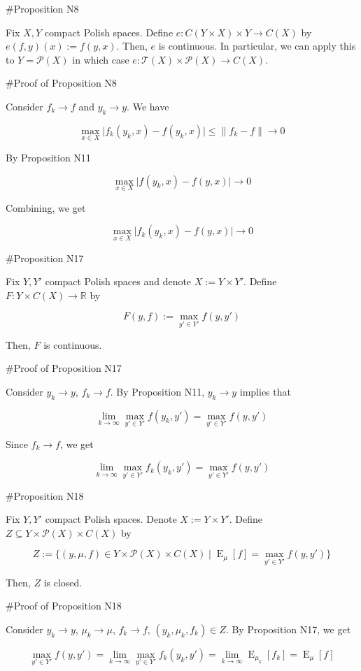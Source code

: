 \documentclass[a4paper]{article}
\DeclareMathOperator{\E}{E}
\newcommand{\Reals}{\mathbb{R}}
\newcommand{\Abs}[1]{\lvert #1 \rvert}
\newcommand{\Norm}[1]{\lVert #1 \rVert}
\newcommand{\Prob}{\mathcal{P}}
\newcommand{\T}{\mathcal{T}}
\begin{document}
\#Proposition N8

Fix ${X,Y}$ compact Polish spaces. Define ${e: C(Y \times X) \times Y \rightarrow C(X)}$ by ${e(f,y)(x):=f(y,x)}$. Then, ${e}$ is continuous. In particular, we can apply this to ${Y = \Prob(X)}$ in which case ${e: \T(X) \times \Prob(X) \rightarrow C(X)}$.

\#Proof of Proposition N8

Consider ${f_k \rightarrow f}$ and ${y_k \rightarrow y}$. We have

$$\max_{x \in X} \Abs{f_k(y_k,x)-f(y_k,x)} \leq \Norm{f_k - f} \rightarrow 0$$

By Proposition N11

$$\max_{x \in X} \Abs{f(y_k,x)-f(y,x)} \rightarrow 0$$

Combining, we get

$$\max_{x \in X} \Abs{f_k(y_k,x)-f(y,x)} \rightarrow 0$$

\#Proposition N17

Fix ${Y,Y'}$ compact Polish spaces and denote ${X:=Y \times Y'}$. Define ${F: Y \times C(X) \rightarrow \Reals}$ by 

$${F(y,f):=\max_{y' \in Y'} f(y,y')}$$

Then, ${F}$ is continuous.

\#Proof of Proposition N17

Consider ${y_k \rightarrow y}$, ${f_k \rightarrow f}$. By Proposition N11, ${y_k \rightarrow y}$ implies that

$${\lim_{k \rightarrow \infty} \max_{y' \in Y'} f(y_k,y') = \max_{y' \in Y'} f(y,y')}$$

Since ${f_k \rightarrow f}$, we get

$${\lim_{k \rightarrow \infty} \max_{y' \in Y'} f_k(y_k,y') = \max_{y' \in Y'} f(y,y')}$$

\#Proposition N18

Fix ${Y,Y'}$ compact Polish spaces. Denote ${X:=Y \times Y'}$. Define ${Z \subseteq Y \times \Prob(X) \times C(X)}$ by

$$Z:=\{(y,\mu,f) \in Y \times \Prob(X) \times C(X) \mid \E_\mu[f] = \max_{y' \in Y'} f(y,y')\}$$

Then, ${Z}$ is closed.

\#Proof of Proposition N18

Consider ${y_k \rightarrow y}$, ${\mu_k \rightarrow \mu}$, ${f_k \rightarrow f}$, ${(y_k,\mu_k,f_k) \in Z}$. By Proposition N17, we get

$$\max_{y' \in Y'} f(y,y') = \lim_{k \rightarrow \infty} \max_{y' \in Y'} f_k(y_k,y')= \lim_{k \rightarrow \infty} \E_{\mu_k}[f_k] = \E_{\mu}[f]$$
\end{document}

